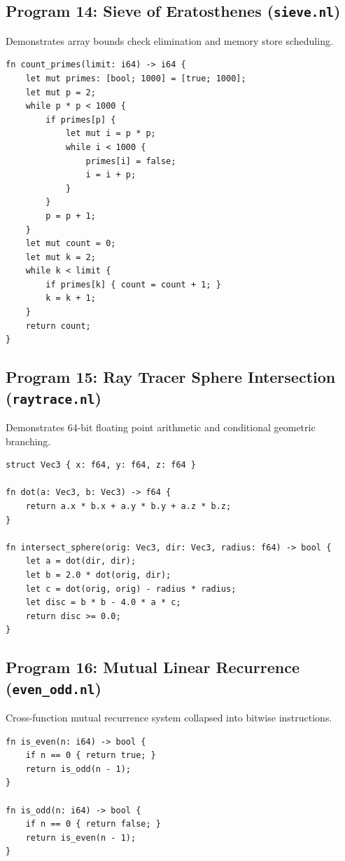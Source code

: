 \subsection{Program 14: Sieve of Eratosthenes (\texttt{sieve.nl})}
Demonstrates array bounds check elimination and memory store scheduling.

\begin{lstlisting}[language=NumLang, caption={Sieve of Eratosthenes in NumLang.}]
fn count_primes(limit: i64) -> i64 {
    let mut primes: [bool; 1000] = [true; 1000];
    let mut p = 2;
    while p * p < 1000 {
        if primes[p] {
            let mut i = p * p;
            while i < 1000 {
                primes[i] = false;
                i = i + p;
            }
        }
        p = p + 1;
    }
    let mut count = 0;
    let mut k = 2;
    while k < limit {
        if primes[k] { count = count + 1; }
        k = k + 1;
    }
    return count;
}
\end{lstlisting}

\subsection{Program 15: Ray Tracer Sphere Intersection (\texttt{raytrace.nl})}
Demonstrates 64-bit floating point arithmetic and conditional geometric branching.

\begin{lstlisting}[language=NumLang, caption={Ray-Sphere Intersection in NumLang.}]
struct Vec3 { x: f64, y: f64, z: f64 }

fn dot(a: Vec3, b: Vec3) -> f64 {
    return a.x * b.x + a.y * b.y + a.z * b.z;
}

fn intersect_sphere(orig: Vec3, dir: Vec3, radius: f64) -> bool {
    let a = dot(dir, dir);
    let b = 2.0 * dot(orig, dir);
    let c = dot(orig, orig) - radius * radius;
    let disc = b * b - 4.0 * a * c;
    return disc >= 0.0;
}
\end{lstlisting}

\subsection{Program 16: Mutual Linear Recurrence (\texttt{even\_odd.nl})}
Cross-function mutual recurrence system collapsed into bitwise instructions.

\begin{lstlisting}[language=NumLang, caption={Mutual Linear Recurrence in NumLang.}]
fn is_even(n: i64) -> bool {
    if n == 0 { return true; }
    return is_odd(n - 1);
}

fn is_odd(n: i64) -> bool {
    if n == 0 { return false; }
    return is_even(n - 1);
}
\end{lstlisting}


